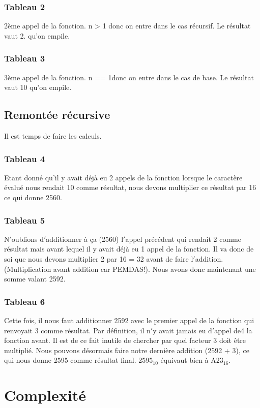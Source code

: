 \documentclass[a4paper, 11pt, oneside]{article}
\begin{document}
\subsubsection{Tableau 2}
2ème appel de la fonction. n > 1 donc on entre dans le cas récursif. Le résultat 
vaut 2. qu'on empile.

\subsubsection{Tableau 3}
3ème appel de la fonction. n == 1donc on entre dans le cas de base. Le résultat 
vaut 10 qu'on empile.

\subsection{Remontée récursive}
Il est temps de faire les calculs.

\subsubsection{Tableau 4}
Etant donné qu'il y avait déjà eu 2 appels de la fonction lorsque le caractère
évalué nous rendait 10 comme résultat, nous devons multiplier ce résultat par 
16 ce qui donne 2560.

\subsubsection{Tableau 5}
N$'$oublions d$'$additionner à ça (2560) l$'$appel précédent qui rendait 2 comme
résultat mais avant lequel il y avait déjà eu 1 appel de la fonction. Il va donc 
de soi que nous devons multiplier 2 par 16 = 32 avant de faire l$'$addition.
(Multiplication avant addition car PEMDAS!). Nous avons donc maintenant une somme 
valant 2592.

\subsubsection{Tableau 6}
Cette fois, il nous faut additionner 2592 avec le premier appel de la fonction qui
renvoyait 3 comme résultat. Par définition, il n$'$y avait jamais eu d$'$appel de4
la fonction avant. Il est de ce fait inutile de chercher par quel facteur 3 doit 
être multiplié. Nous pouvons désormais faire notre dernière addition (2592 + 3), 
ce qui nous donne 2595 comme résultat final. 2595$_{10}$ équivaut bien à 
A23$_{16}$.


\section{Complexité}\label{complexite}
\end{document}
